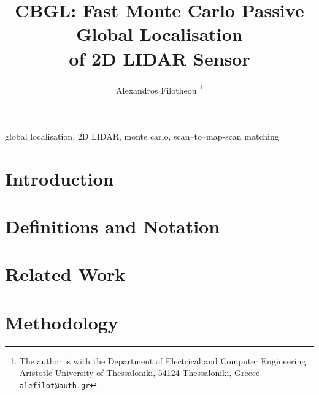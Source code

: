 \documentclass[letterpaper, 10 pt, conference]{ieeeconf}
\begin{document}
\title{\LARGE \bf CBGL: Fast Monte Carlo Passive Global Localisation \\ of 2D LIDAR Sensor}

\author{Alexandros Filotheou%
 \thanks{The author is with the Department of Electrical and Computer Engineering,
  Aristotle University of Thessaloniki, 54124 Thessaloniki, Greece  {\tt\small alefilot@auth.gr}}%
}

\maketitle
\thispagestyle{empty}
\pagestyle{empty}

\begin{abstract}
  
\end{abstract}

\begin{keywords}
global localisation, 2D LIDAR, monte carlo, scan--to--map-scan matching
\end{keywords}

\section{Introduction}
  

\section{Definitions and Notation}
  \label{section:definitions}
  

\section{Related Work}
  \label{section:sota}
  

\section{Methodology}
  \label{section:the_proposed_method}
  
\end{document}
